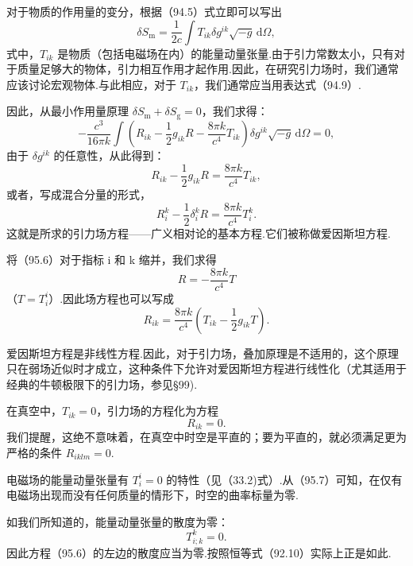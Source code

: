 对于物质的作用量的变分，根据（94.5）式立即可以写出
\begin{equation}
  \delta S_{\mathrm{m}}=\frac{1}{2c}\int T_{ik}\delta g^{ik}
  \sqrt{-g}\,\mathrm{d}\varOmega,
\end{equation}
式中，$T_{ik}$ 是物质（包括电磁场在内）的能量动量张量.由于引力常数太小，只有对于质量足够大的物体，引力相互作用才起作用.因此，在研究引力场时，我们通常应该讨论宏观物体.与此相应，对于 $T_{ik}$，我们通常应当用表达式（94.9）.

因此，从最小作用量原理 $\delta S_{\mathrm{m}}+\delta S_{\mathrm{g}}=0$，我们求得：
\begin{equation*}
  -\frac{c^3}{16\pi k}\int\left(R_{ik}-\frac{1}{2}g_{ik}R
  -\frac{8\pi k}{c^4}T_{ik}\right)\delta g^{ik}\sqrt{-g}\,\mathrm{d}\varOmega=0,
\end{equation*}
由于 $\delta g^{ik}$ 的任意性，从此得到：
\begin{equation}
  R_{ik}-\frac{1}{2}g_{ik}R=\frac{8\pi k}{c^4}T_{ik},
\end{equation}
或者，写成混合分量的形式，
\begin{equation}
  R^k_i-\frac{1}{2}\delta^k_iR=\frac{8\pi k}{c^4}T^k_i.
\end{equation}
这就是所求的引力场方程——广义相对论的基本方程.它们被称做爱因斯坦方程.

将（95.6）对于指标 i 和 k 缩并，我们求得
\begin{equation}
  R=-\frac{8\pi k}{c^4}T
\end{equation}
（$T=T_i^i$）.因此场方程也可以写成
\begin{equation}
  R_{ik}=\frac{8\pi k}{c^4}\left(T_{ik}-\frac{1}{2}g_{ik}T\right).
\end{equation}

爱因斯坦方程是非线性方程.因此，对于引力场，叠加原理是不适用的，这个原理只在弱场近似时才成立，这种条件下允许对爱因斯坦方程进行线性化（尤其适用于经典的牛顿极限下的引力场，参见§99).

在真空中，$T_{ik}=0$，引力场的方程化为方程
\begin{equation}
  R_{ik}=0.
\end{equation}
我们提醒，这绝不意味着，在真空中时空是平直的；要为平直的，就必须满足更为严格的条件 $R_{iklm}=0$.

电磁场的能量动量张量有 $T_i^i=0$ 的特性（见（33.2)式）.从（95.7）可知，在仅有电磁场出现而没有任何质量的情形下，时空的曲率标量为零.

如我们所知道的，能量动量张量的散度为零：
\begin{equation}
  T^k_{i;k}=0.
\end{equation}
因此方程（95.6）的左边的散度应当为零.按照恒等式（92.10）实际上正是如此.

